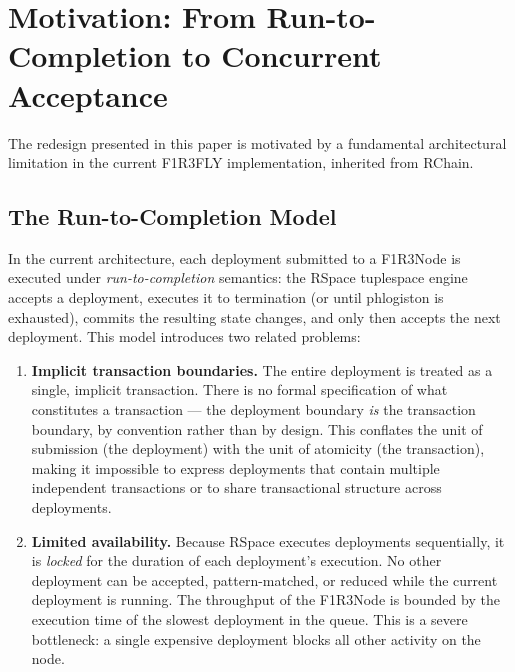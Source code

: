 \documentclass[11pt,a4paper]{article}
\begin{document}
\section{Motivation: From Run-to-Completion to Concurrent Acceptance}
\label{sec:motivation}

The redesign presented in this paper is motivated by a
fundamental architectural limitation in the current F1R3FLY
implementation, inherited from RChain.

\subsection{The Run-to-Completion Model}
\label{sec:run-to-completion}

In the current architecture, each deployment submitted to a
F1R3Node is executed under \emph{run-to-completion} semantics:
the RSpace tuplespace engine accepts a deployment, executes it
to termination (or until phlogiston is exhausted), commits the
resulting state changes, and only then accepts the next
deployment.  This model introduces two related problems:

\begin{enumerate}[label=(\roman*)]
  \item \textbf{Implicit transaction boundaries.}  The entire
    deployment is treated as a single, implicit transaction.
    There is no formal specification of what constitutes a
    transaction --- the deployment boundary \emph{is} the
    transaction boundary, by convention rather than by
    design.  This conflates the unit of submission (the
    deployment) with the unit of atomicity (the transaction),
    making it impossible to express deployments that contain
    multiple independent transactions or to share
    transactional structure across deployments.

  \item \textbf{Limited availability.}  Because RSpace
    executes deployments sequentially, it is \emph{locked}
    for the duration of each deployment's execution.  No
    other deployment can be accepted, pattern-matched, or
    reduced while the current deployment is running.  The
    throughput of the F1R3Node is bounded by the execution
    time of the slowest deployment in the queue.  This is a
    severe bottleneck: a single expensive deployment blocks
    all other activity on the node.
\end{enumerate}
\end{document}
